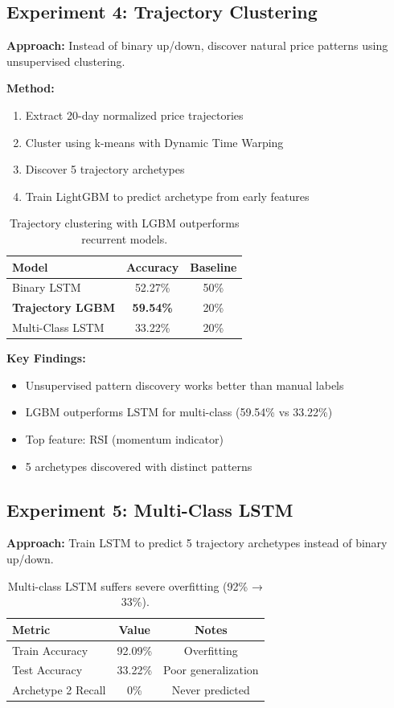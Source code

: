 \documentclass[10pt,twocolumn]{article}
\begin{document}
\subsection{Experiment 4: Trajectory Clustering}

\textbf{Approach:} Instead of binary up/down, discover natural price patterns using unsupervised clustering.

\textbf{Method:}
\begin{enumerate}
\item Extract 20-day normalized price trajectories
\item Cluster using k-means with Dynamic Time Warping
\item Discover 5 trajectory archetypes
\item Train LightGBM to predict archetype from early features
\end{enumerate}

\begin{table}[h]
\centering
\small
\begin{tabular}{lcc}
\toprule
Model & Accuracy & Baseline \\
\midrule
Binary LSTM & 52.27\% & 50\% \\
\textbf{Trajectory LGBM} & \textbf{59.54\%} & 20\% \\
Multi-Class LSTM & 33.22\% & 20\% \\
\bottomrule
\end{tabular}
\caption{Trajectory clustering with LGBM outperforms recurrent models.}
\end{table}

\textbf{Key Findings:}
\begin{itemize}
\item Unsupervised pattern discovery works better than manual labels
\item LGBM outperforms LSTM for multi-class (59.54\% vs 33.22\%)
\item Top feature: RSI (momentum indicator)
\item 5 archetypes discovered with distinct patterns
\end{itemize}

\subsection{Experiment 5: Multi-Class LSTM}

\textbf{Approach:} Train LSTM to predict 5 trajectory archetypes instead of binary up/down.

\begin{table}[h]
\centering
\small
\begin{tabular}{lcc}
\toprule
Metric & Value & Notes \\
\midrule
Train Accuracy & 92.09\% & Overfitting \\
Test Accuracy & 33.22\% & Poor generalization \\
Archetype 2 Recall & 0\% & Never predicted \\
\bottomrule
\end{tabular}
\caption{Multi-class LSTM suffers severe overfitting (92\% → 33\%).}
\end{table}
\end{document}
